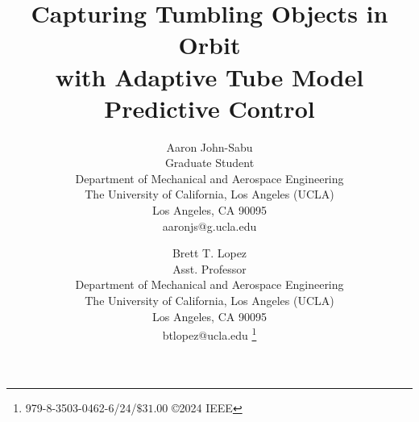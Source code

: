 \documentclass[twocolumn,letterpaper]{IEEEAerospaceCLS}  %
\begin{document}
\title{Capturing Tumbling Objects in Orbit\\with Adaptive Tube Model Predictive Control}

\author{%
Aaron John-Sabu\\ 
Graduate Student\\
Department of Mechanical and Aerospace Engineering\\
The University of California, Los Angeles (UCLA)\\
Los Angeles, CA 90095\\
aaronjs@g.ucla.edu
\and 
Brett T. Lopez\\
Asst. Professor\\
Department of Mechanical and Aerospace Engineering\\
The University of California, Los Angeles (UCLA)\\
Los Angeles, CA 90095\\
btlopez@ucla.edu
\thanks{\footnotesize 979-8-3503-0462-6/24/$\$31.00$ \copyright2024 IEEE}}

\maketitle

\thispagestyle{plain}
\pagestyle{plain}

\maketitle

\thispagestyle{plain}
\pagestyle{plain}


\tableofcontents
\setcounter{secnumdepth}{3}











% 


\end{document}
